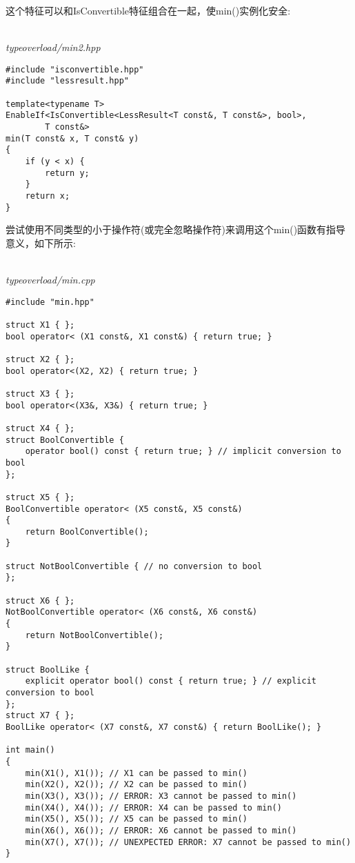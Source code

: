 这个特征可以和IsConvertible特征组合在一起，使min()实例化安全:

\hspace*{\fill} \\ %
\noindent
\textit{typeoverload/min2.hpp}
\begin{lstlisting}[style=styleCXX]
#include "isconvertible.hpp"
#include "lessresult.hpp"

template<typename T>
EnableIf<IsConvertible<LessResult<T const&, T const&>, bool>,
		T const&>
min(T const& x, T const& y)
{
	if (y < x) {
		return y;
	}
	return x;
}
\end{lstlisting}

尝试使用不同类型的小于操作符(或完全忽略操作符)来调用这个min()函数有指导意义，如下所示:

\hspace*{\fill} \\ %
\noindent
\textit{typeoverload/min.cpp}
\begin{lstlisting}[style=styleCXX]
#include "min.hpp"

struct X1 { };
bool operator< (X1 const&, X1 const&) { return true; }

struct X2 { };
bool operator<(X2, X2) { return true; }

struct X3 { };
bool operator<(X3&, X3&) { return true; }

struct X4 { };
struct BoolConvertible {
	operator bool() const { return true; } // implicit conversion to bool
};

struct X5 { };
BoolConvertible operator< (X5 const&, X5 const&)
{
	return BoolConvertible();
}

struct NotBoolConvertible { // no conversion to bool
};

struct X6 { };
NotBoolConvertible operator< (X6 const&, X6 const&)
{
	return NotBoolConvertible();
}

struct BoolLike {
	explicit operator bool() const { return true; } // explicit conversion to bool
};
struct X7 { };
BoolLike operator< (X7 const&, X7 const&) { return BoolLike(); }

int main()
{
	min(X1(), X1()); // X1 can be passed to min()
	min(X2(), X2()); // X2 can be passed to min()
	min(X3(), X3()); // ERROR: X3 cannot be passed to min()
	min(X4(), X4()); // ERROR: X4 can be passed to min()
	min(X5(), X5()); // X5 can be passed to min()
	min(X6(), X6()); // ERROR: X6 cannot be passed to min()
	min(X7(), X7()); // UNEXPECTED ERROR: X7 cannot be passed to min()
}
\end{lstlisting}

